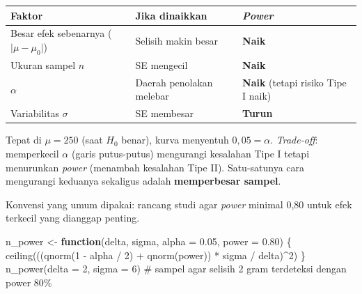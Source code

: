 \documentclass[
  indonesian,
  letterpaper,
]{book}
\newenvironment{Shaded}{\begin{snugshade}}{\end{snugshade}}
\newcommand{\AttributeTok}[1]{\textcolor[rgb]{0.40,0.45,0.13}{#1}}
\newcommand{\CommentTok}[1]{\textcolor[rgb]{0.37,0.37,0.37}{#1}}
\newcommand{\ControlFlowTok}[1]{\textcolor[rgb]{0.00,0.23,0.31}{\textbf{#1}}}
\newcommand{\DecValTok}[1]{\textcolor[rgb]{0.68,0.00,0.00}{#1}}
\newcommand{\FloatTok}[1]{\textcolor[rgb]{0.68,0.00,0.00}{#1}}
\newcommand{\FunctionTok}[1]{\textcolor[rgb]{0.28,0.35,0.67}{#1}}
\newcommand{\NormalTok}[1]{\textcolor[rgb]{0.00,0.23,0.31}{#1}}
\newcommand{\OtherTok}[1]{\textcolor[rgb]{0.00,0.23,0.31}{#1}}
\newcommand{\SpecialCharTok}[1]{\textcolor[rgb]{0.37,0.37,0.37}{#1}}
\newcounter{none} %
\begin{document}
{\def\LTcaptype{none} %
\begin{longtable}[]{@{}
  >{\raggedright\arraybackslash}p{}
  >{\raggedright\arraybackslash}p{}
  >{\raggedright\arraybackslash}p{}@{}}
\toprule\noalign{}
\begin{minipage}[b]{\linewidth}\raggedright
Faktor
\end{minipage} & \begin{minipage}[b]{\linewidth}\raggedright
Jika dinaikkan
\end{minipage} & \begin{minipage}[b]{\linewidth}\raggedright
\emph{Power}
\end{minipage} \\
\midrule\noalign{}
\endhead
\bottomrule\noalign{}
\endlastfoot
Besar efek sebenarnya (\(\lvert \mu - \mu_0 \rvert\)) & Selisih makin
besar & \textbf{Naik} \\
Ukuran sampel \(n\) & SE mengecil & \textbf{Naik} \\
\(\alpha\) & Daerah penolakan melebar & \textbf{Naik} (tetapi risiko
Tipe I naik) \\
Variabilitas \(\sigma\) & SE membesar & \textbf{Turun} \\
\end{longtable}
}

Tepat di \(\mu = 250\) (saat \(H_0\) benar), kurva menyentuh
\(0{,}05 = \alpha\). \emph{Trade-off}: memperkecil \(\alpha\) (garis
putus-putus) mengurangi kesalahan Tipe I tetapi menurunkan \emph{power}
(menambah kesalahan Tipe II). Satu-satunya cara mengurangi keduanya
sekaligus adalah \textbf{memperbesar sampel}.

Konvensi yang umum dipakai: rancang studi agar \emph{power} minimal 0,80
untuk efek terkecil yang dianggap penting.

\begin{Shaded}
\begin{Highlighting}[]
\NormalTok{n\_power }\OtherTok{\textless{}{-}} \ControlFlowTok{function}\NormalTok{(delta, sigma, }\AttributeTok{alpha =} \FloatTok{0.05}\NormalTok{, }\AttributeTok{power =} \FloatTok{0.80}\NormalTok{) \{}
  \FunctionTok{ceiling}\NormalTok{(((}\FunctionTok{qnorm}\NormalTok{(}\DecValTok{1} \SpecialCharTok{{-}}\NormalTok{ alpha }\SpecialCharTok{/} \DecValTok{2}\NormalTok{) }\SpecialCharTok{+} \FunctionTok{qnorm}\NormalTok{(power)) }\SpecialCharTok{*}\NormalTok{ sigma }\SpecialCharTok{/}\NormalTok{ delta)}\SpecialCharTok{\^{}}\DecValTok{2}\NormalTok{)}
\NormalTok{\}}
\FunctionTok{n\_power}\NormalTok{(}\AttributeTok{delta =} \DecValTok{2}\NormalTok{, }\AttributeTok{sigma =} \DecValTok{6}\NormalTok{)   }\CommentTok{\# sampel agar selisih 2 gram terdeteksi dengan power 80\%}
\end{Highlighting}
\end{Shaded}
\end{document}
